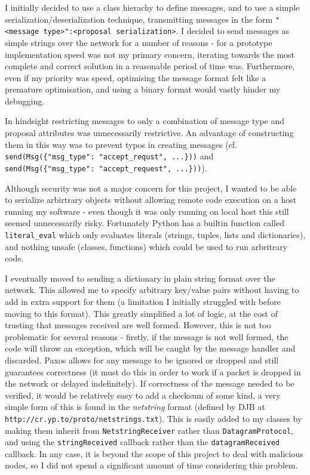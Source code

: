 \documentclass[12pt,twoside,notitlepage]{report}
\begin{document}
I initially decided to use a class hierachy to define messages, and to use a simple
serialization/deserialization technique, transmitting messages in the form
\verb+"<message type>":<proposal serialization>+. I decided to send messages as simple strings
over the network for a number of reasons - for a prototype implementation speed was not my primary
concern, iterating towards the most complete and correct solution in a reasonable period of time
was. Furthermore, even if my priority was speed, optimising the message format felt like a
premature optimisation, and using a binary format would vastly hinder my debugging.

In hindsight restricting messages to only a combination of message type and proposal attributes
was unnecessarily restrictive. An advantage of constructing them in this way was to prevent typos
in creating messages (cf. \verb+send(Msg({"msg_type": "accept_requst", ...}))+
and \verb+send(Msg({"msg_type": "accept_request", ...}))+).

Although security was not a major concern for this project, I wanted to be able to serialize
arbirtrary objects without allowing remote code execution on a host running my software - even
though it was only running on local host this still seemed unnecessarily risky. Fortunately Python
has a builtin function called \verb+literal_eval+ which only evaluates literals (strings, tuples,
lists and dictionaries), and nothing unsafe (classes, functions) which could be used to run
arbritrary code.

I eventually moved to sending a dictionary in plain string format over the network. This allowed
me to specify arbitrary key/value pairs without having to add in extra support for them (a
limitation I initially struggled with before moving to this format). This greatly simplified a lot
of logic, at the cost of trusting that messages received are well formed.  However, this is not
too problematic for several reasons - firstly, if the message is not well formed, the code will
throw an exception, which will be caught by the message handler and discarded. Paxos allows for
any message to be ignored or dropped and still guarantees correctness (it must do this in order to
work if a packet is dropped in the network or delayed indefinitely). If correctness of the message
needed to be verified, it would be relatively easy to add a checksum of some kind, a very simple
form of this is found in the \emph{netstring} format (defined by DJB at
\verb+http://cr.yp.to/proto/netstrings.txt+). This is easily added to my classes by making them
inherit from \verb+NetstringReceiver+ rather than \verb+DatagramProtocol+, and using
the \verb+stringReceived+ callback rather than the \verb+datagramReceived+ callback. In any case,
it is beyond the scope of this project to deal with malicious nodes, so I did not spend a
significant amount of time considering this problem.
\end{document}
